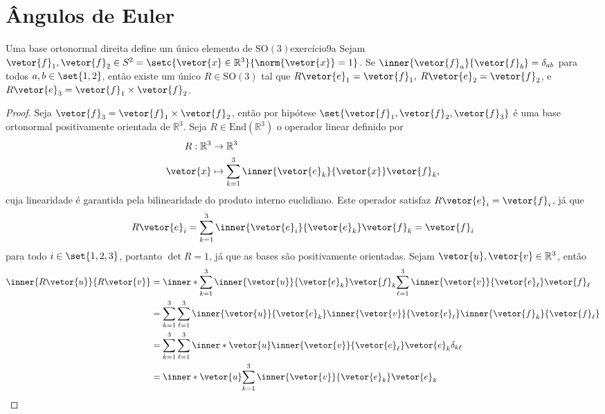 \section{Ângulos de Euler}
\begin{lemma}{Uma base ortonormal direita define um único elemento de \(\mathrm{SO}(3)\)}{exercício9a}
    Sejam \(\vetor{f}_1, \vetor{f}_2 \in S^2 = \setc{\vetor{x} \in \mathbb{R}^3}{\norm{\vetor{x}}=1}\). Se \(\inner{\vetor{f}_a}{\vetor{f}_b} = \delta_{ab}\) para todos \(a,b \in \set{1,2}\), então existe um único \(R \in \mathrm{SO}(3)\) tal que \(R\vetor{e}_1 = \vetor{f}_1,\) \(R\vetor{e}_2 = \vetor{f}_2\), e \(R\vetor{e}_3 = \vetor{f}_1\times\vetor{f}_2\).
\end{lemma}
\begin{proof}
    Seja \(\vetor{f}_3 = \vetor{f}_1 \times \vetor{f}_2\), então por hipótese \(\set{\vetor{f}_1, \vetor{f}_2, \vetor{f}_3}\) é uma base ortonormal positivamente orientada de \(\mathbb{R}^3\). Seja \(R \in \mathrm{End}(\mathbb{R}^3)\) o operador linear definido por
    \begin{align*}
        R : \mathbb{R}^3 &\to \mathbb{R}^3\\
               \vetor{x} &\mapsto \sum_{k = 1}^3 \inner{\vetor{e}_k}{\vetor{x}}\vetor{f}_k,
    \end{align*}
    cuja linearidade é garantida pela bilinearidade do produto interno euclidiano. Este operador satisfaz \(R\vetor{e}_i = \vetor{f}_i\), já que
    \begin{equation*}
        R\vetor{e}_i = \sum_{k = 1}^3\inner{\vetor{e}_i}{\vetor{e}_k}\vetor{f}_k = \vetor{f}_i
    \end{equation*}
    para todo \(i \in \set{1,2,3}\), portanto \(\det{R} = 1\), já que as bases são positivamente orientadas. Sejam \(\vetor{u}, \vetor{v} \in \mathbb{R}^3\), então
    \begin{align*}
        \inner{R\vetor{u}}{R\vetor{v}}
        &= \inner*{\sum_{k = 1}^3\inner{\vetor{u}}{\vetor{e}_k}\vetor{f}_k}{\sum_{\ell = 1}^3\inner{\vetor{v}}{\vetor{e}_\ell}\vetor{f}_\ell}\\
        &= \sum_{k = 1}^3 \sum_{\ell = 1}^3 \inner{\vetor{u}}{\vetor{e}_k}\inner{\vetor{v}}{\vetor{e}_\ell}\inner{\vetor{f}_k}{\vetor{f}_\ell}\\
        &= \sum_{k = 1}^3 \sum_{\ell = 1}^3\inner*{\vetor{u}}{\inner{\vetor{v}}{\vetor{e}_\ell}\vetor{e}_k} \delta_{k \ell}\\
        &= \inner*{\vetor{u}}{\sum_{k = 1}^3\inner{\vetor{v}}{\vetor{e}_k}\vetor{e}_k}\\

\end{align*}
\end{proof}
